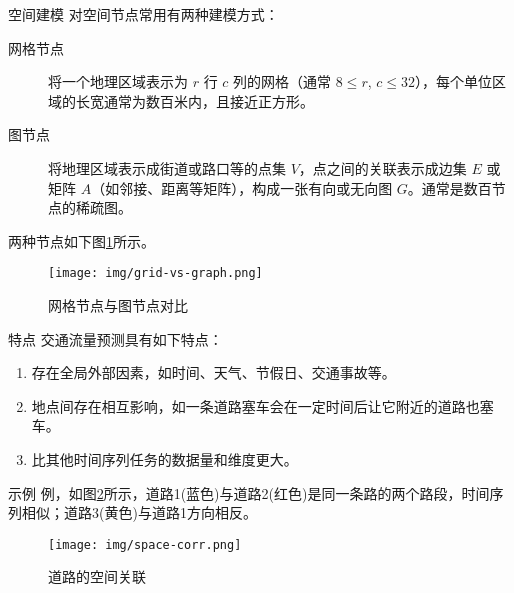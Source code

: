 \documentclass{libs/format}
\begin{document}
\begin{frame}{空间建模}
  对空间节点常用有两种建模方式：

  \begin{description}
    \item[网格节点] 将一个地理区域表示为 $r$ 行 $c$ 列的网格（通常 $8\le r$, $c\le 32$），每个单位区域的长宽通常为数百米内，且接近正方形。
    \item[图节点] 将地理区域表示成街道或路口等的点集 $V$，点之间的关联表示成边集 $E$ 或矩阵 $A$（如邻接、距离等矩阵），构成一张有向或无向图 $G$。通常是数百节点的稀疏图。
  \end{description}

  两种节点如下图\ref{fig:grid-vs-graph}所示。
  \begin{figure}
    \centering
    \texttt{[image: img/grid-vs-graph.png]}
    \caption{网格节点与图节点对比\cite{T-ZS30}}\label{fig:grid-vs-graph}
  \end{figure}
\end{frame}


\begin{frame}{特点}
  交通流量预测具有如下特点：\cite{T-ZS1, T-ZS2}
  \begin{enumerate}
    \item 存在全局外部因素，如时间、天气、节假日、交通事故等。
    \item 地点间存在相互影响，如一条道路塞车会在一定时间后让它附近的道路也塞车。
    \item 比其他时间序列任务的数据量和维度更大。
  \end{enumerate}
  \begin{exampleblock}{示例}
    例，如图\ref{fig:space-corr}所示，道路1(蓝色)与道路2(红色)是同一条路的两个路段，时间序列相似；道路3(黄色)与道路1方向相反。
  \end{exampleblock}
  \begin{figure}
    \centering
    \texttt{[image: img/space-corr.png]}
    \caption{道路的空间关联\cite{T-ZS40}}\label{fig:space-corr}
  \end{figure}
\end{frame}
\end{document}
